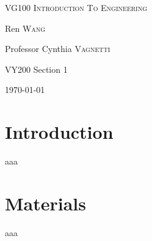 \documentclass[12pt,a4paper]{article}
\begin{document}
\linespread{2}



\begin{center}
\vspace*{0.7in}
\vspace*{0.7in}






\begin{center} 

{
    \linespread{2}
        \Huge
\textsc{VG100 Introduction To Engineering} \\
}

Ren \textsc{Wang}

Professor Cynthia \textsc{Vagnetti} 

VY200 Section 1


{\large \today}


\end{center}



\end{center}
\newpage



\tableofcontents
\newpage

\section{Introduction}
aaa
\section{Materials}
aaa
\end{document}
